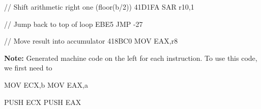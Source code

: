 \documentclass{report}
\begin{document}
\begin{itemize}
\begin{cppcode}
                // Shift arithmetic right one (floor(b/2))
                41D1FA   SAR   r10,1
    
                // Jump back to top of loop
                EBE5     JMP    -27

                // Move result into accumulator
                418BC0   MOV   EAX,r8
            \end{cppcode}
            \bigbreak \noindent 
            \textbf{Note:} Generated machine code on the left for each instruction.             To use this code, we first need to
            \bigbreak \noindent 
            \begin{cppcode}
            MOV   ECX,b
            MOV   EAX,a

            PUSH  ECX
            PUSH  EAX
            \end{cppcode}


\end{itemize}
\end{document}
